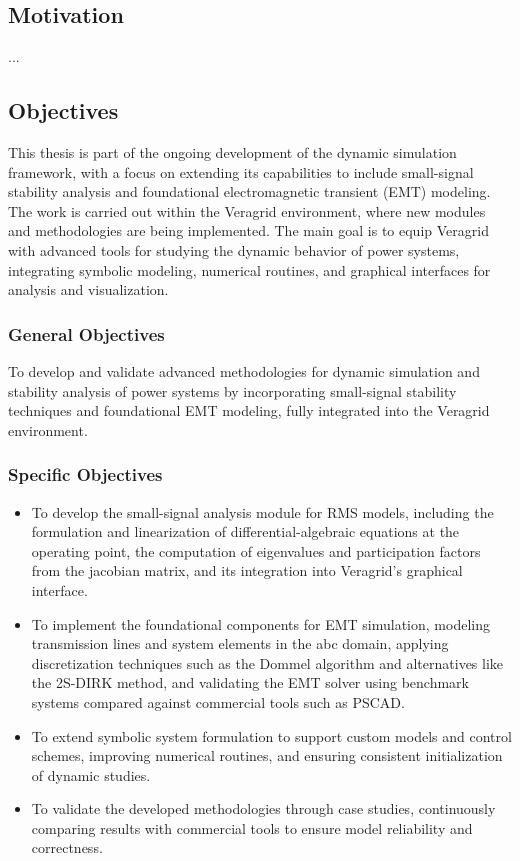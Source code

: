\subsection{Motivation}

...

\subsection{Objectives}

This thesis is part of the ongoing development of the dynamic simulation framework, 
with a focus on extending its capabilities to include small-signal stability analysis and foundational electromagnetic transient (EMT) modeling. 
The work is carried out within the Veragrid environment, where new modules and methodologies are being implemented. 
The main goal is to equip Veragrid with advanced tools for studying the dynamic behavior of power systems, integrating symbolic modeling, numerical routines,
and graphical interfaces for analysis and visualization.

\subsubsection*{General Objectives}

To develop and validate advanced methodologies for dynamic simulation and stability analysis of power systems by incorporating small-signal stability techniques and foundational EMT modeling, fully integrated into the Veragrid environment.

\subsubsection*{Specific Objectives}

\begin{itemize}
    \item To develop the small-signal analysis module for RMS models, including the formulation and linearization of differential-algebraic equations at the operating point,
     the computation of eigenvalues and participation factors from the jacobian matrix, and its integration into Veragrid's graphical interface.
    \item To implement the foundational components for EMT simulation, modeling transmission lines and system elements in the abc domain, applying discretization techniques
     such as the Dommel algorithm and alternatives like the 2S-DIRK method, and validating the EMT solver using benchmark systems compared against commercial tools such as PSCAD.
    \item To extend symbolic system formulation to support custom models and control schemes, improving numerical routines, and ensuring consistent initialization of dynamic studies.
    \item To validate the developed methodologies through case studies, continuously comparing results with commercial tools to ensure model reliability and correctness.
\end{itemize}




